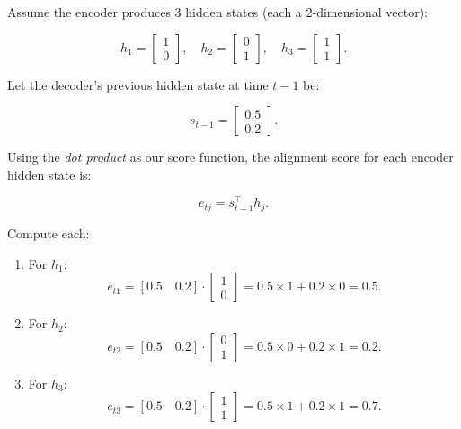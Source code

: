 

Assume the encoder produces 3 hidden states (each a 2-dimensional vector):

\[
h_1 = \begin{bmatrix} 1 \\ 0 \end{bmatrix}, \quad
h_2 = \begin{bmatrix} 0 \\ 1 \end{bmatrix}, \quad
h_3 = \begin{bmatrix} 1 \\ 1 \end{bmatrix}.
\]

Let the decoder’s previous hidden state at time \( t-1 \) be:

\[
s_{t-1} = \begin{bmatrix} 0.5 \\ 0.2 \end{bmatrix}.
\]

Using the \textit{dot product} as our score function, the alignment score for each encoder hidden state is:

\[
e_{tj} = s_{t-1}^\top h_j.
\]

Compute each:
\begin{enumerate}
	\item  For \( h_1 \):
   \[
   e_{t1} = [0.5 \quad 0.2] \cdot \begin{bmatrix} 1 \\ 0 \end{bmatrix} = 0.5 \times 1 + 0.2 \times 0 = 0.5.
   \]
\item For \( h_2 \):
   \[
   e_{t2} = [0.5 \quad 0.2] \cdot \begin{bmatrix} 0 \\ 1 \end{bmatrix} = 0.5 \times 0 + 0.2 \times 1 = 0.2.
   \]
\item For \( h_3 \):
   \[
   e_{t3} = [0.5 \quad 0.2] \cdot \begin{bmatrix} 1 \\ 1 \end{bmatrix} = 0.5 \times 1 + 0.2 \times 1 = 0.7.
   \]
\end{enumerate}

